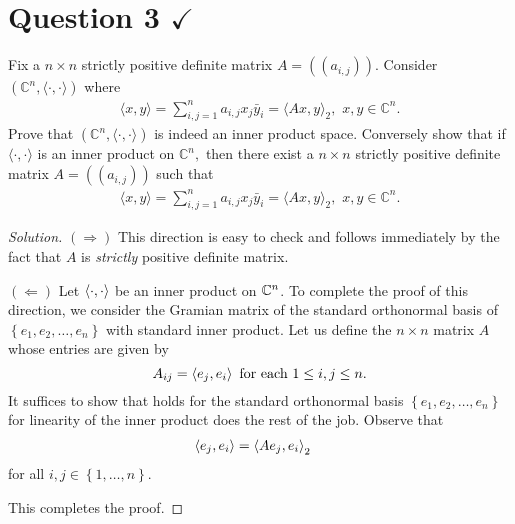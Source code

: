 \section{Question 3 \texorpdfstring{$\checkmark$}{}}
\horz
Fix a $n\times n$ strictly positive definite matrix $A= (\!\!( a_{i,j})\!\!).$ Consider $(\mathbb C^n, \langle \cdot, \cdot \rangle)$ where 
\begin{align*}
\langle x, y \rangle = \sum\limits_{i,j=1}^n a_{i,j}x_j \bar{y}_i = \langle Ax,y\rangle_2,\,\,x,y\in \mathbb C^n.
\end{align*}
Prove that  $(\mathbb C^n, \langle \cdot, \cdot \rangle)$ is indeed an inner product space. Conversely show that if $\langle \cdot, \cdot \rangle$ is an inner product on $\mathbb C^n,$ then there exist a $n\times n$ strictly  positive definite matrix $A= (\!\!( a_{i,j})\!\!)$ such that \begin{align*}
    \langle x, y \rangle = \sum\limits_{i,j=1}^n a_{i,j}x_j \bar{y}_i = \langle Ax,y\rangle_2,\,\,x,y\in \mathbb C^n. \label{eqn:q3}
\end{align*}
\horz

\begin{proof}[Solution]
    $(\Longrightarrow)$ This direction is easy to check and follows immediately by the fact that $A$ is \textit{strictly} positive definite matrix.
    
    $(\Longleftarrow)$ Let $\left\langle \cdot , \cdot \right\rangle$ be an inner product on $\mathbb C ^{n}$. To complete the proof of this direction, we consider the Gramian matrix of the standard orthonormal basis of $\left\{ e_{1}, e_{2}, \ldots , e_{n} \right\}$ with standard inner product. Let us define the $n\times n$ matrix $A$ whose entries are given by
    \begin{equation*}
	A_{ij}= \left\langle e_{j}, e_{i} \right\rangle \text{ for each } 1 \le i,j \le n \text{.}
    \end{equation*}
    It suffices to show that \label{eqn:q3} holds for the standard orthonormal basis $\left\{ e_{1}, e_{2} , \ldots , e_{n} \right\}$ for linearity of the inner product does the rest of the job. Observe that
    \begin{align*}
	\left\langle e_{j}, e_{i} \right\rangle &= \left\langle A{e_{j}}, e_{i} \right\rangle_{2} 
    \end{align*}
    for all $i,j \in \left\{ 1, \ldots , n \right\}$.
    

    This completes the proof.
\end{proof}
